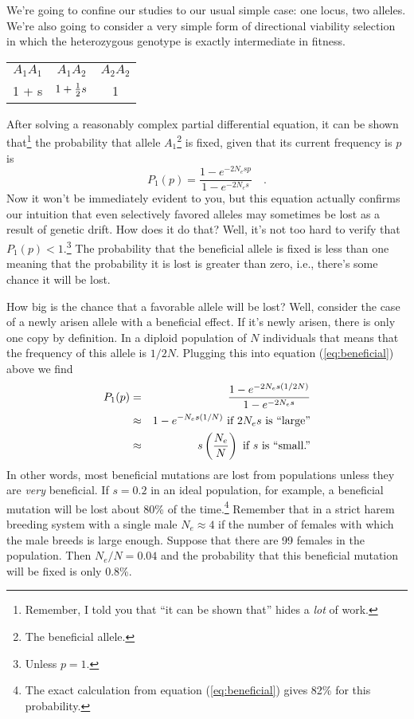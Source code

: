 \documentclass[12pt]{article}
\begin{document}
We're going to confine our studies to our usual simple case: one
locus, two alleles. We're also going to consider a very simple form of
directional viability selection in which the heterozygous genotype is
exactly intermediate in fitness.

\begin{center}
\begin{tabular}{ccc}
$A_1A_1$ & $A_1A_2$      & $A_2A_2$ \\
1 + s    & $1 + \frac{1}{2} s$ & 1
\end{tabular}
\end{center}

After solving a reasonably complex partial differential equation, it
can be shown that\footnote{Remember, I told you that ``it can be shown
that'' hides a {\it lot\/} of work.} the probability that allele
$A_1$\footnote{The beneficial allele.}  is fixed, given that its
current frequency is $p$ is
\begin{equation}
P_1(p) = \frac{1 - e^{-2N_esp}}{1 - e^{-2N_es}} \quad .
\label{eq:beneficial}
\end{equation}
Now it won't be immediately evident to you, but this equation actually
confirms our intuition that even selectively favored alleles may
sometimes be lost as a result of genetic drift. How does it do that?
Well, it's not too hard to verify that $P_1(p) < 1$.\footnote{Unless
  $p=1$.} The probability that the beneficial allele is fixed is less
than one meaning that the probability it is lost is greater than zero,
i.e., there's some chance it will be lost.

How big is the chance that a favorable allele will be
lost? Well, consider the
case of a newly arisen allele with a beneficial effect. If it's newly
arisen, there is only one copy by definition. In a diploid population
of $N$ individuals that means that the frequency of this allele is
$1/2N$. Plugging this into equation (\ref{eq:beneficial}) above we
find
\begin{eqnarray*}
P_1(p) &=& \frac{1 - e^{-2N_es(1/2N)}}{1 - e^{-2N_es}} \\
       &\approx& 1 - e^{-N_es(1/N)} \hbox{ if $2N_es$ is ``large''} \\
       &\approx& s\left(\frac{N_e}{N}\right)
                 \hbox{ if $s$ is ``small.''}
\end{eqnarray*}
In other words, most beneficial mutations are lost from populations
unless they are {\it very\/} beneficial. If $s=0.2$ in an ideal
population, for example, a beneficial mutation will be lost about 80\%
of the time.\footnote{The exact calculation from equation
  (\ref{eq:beneficial}) gives 82\% for this probability.} Remember
that in a strict harem breeding system with a single male $N_e \approx
4$ if the number of females with which the male breeds is large
enough. Suppose that there are 99 females in the population. Then
$N_e/N = 0.04$ and the probability that this beneficial mutation will
be fixed is only 0.8\%.
\end{document}
